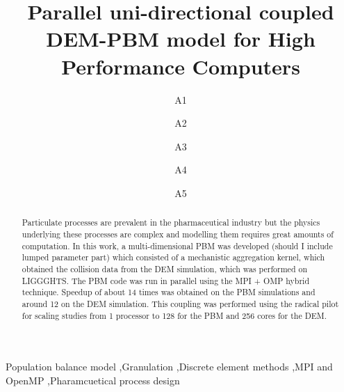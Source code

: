 \documentclass[preprint,11pt,authoryear]{elsarticle}
\begin{document}
\begin{frontmatter}
\title{Parallel uni-directional coupled DEM-PBM model for High Performance Computers}
\author{A1 }
\author{A2 }
\author{A3 }
\author{A4 }
\author{A5} 
\address{Department of Chemical and Biochemical Engineering, Rutgers, The State University of New 
    Jersey, Piscataway, NJ, USA 08854}
\begin{abstract}
Particulate processes are prevalent in the pharmaceutical industry but the physics underlying these 
processes are complex and modelling them requires great amounts of computation. In this work, a 
multi-dimensional PBM was developed (should I include lumped parameter part) which consisted of a 
mechanistic aggregation kernel, which obtained the collision data from the DEM simulation, which was 
performed on LIGGGHTS. The PBM code was run in parallel using the MPI + OMP hybrid technique. 
Speedup of about 14 times was obtained on the PBM simulations and around 12 on the DEM 
simulation. This coupling was performed using the radical pilot for scaling studies from 1 processor to 
128 for the PBM and 256 cores for the DEM.
\end{abstract}
\begin{keyword}
Population balance model \sep Granulation \sep Discrete element methods  \sep MPI and OpenMP 
\sep Pharamcuetical process design
\end{keyword}
\end{frontmatter}
\linenumbers
	
\end{document}
